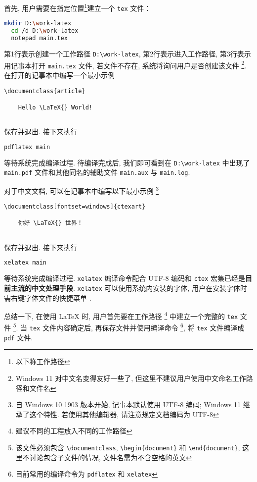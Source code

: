 首先, 用户需要在指定位置\footnote{以下称工作路径}建立一个 \texttt{tex} 文件：
\begin{lstlisting}[language = bash]
  mkdir D:\work-latex
  cd /d D:\work-latex
  notepad main.tex
\end{lstlisting}
第1行表示创建一个工作路径 \texttt{D:\textbackslash work-latex},
第2行表示进入工作路径, 第3行表示用记事本打开 \texttt{main.tex} 文件,
若文件不存在, 系统将询问用户是否创建该文件%
\footnote{Windows 11 对中文名变得友好一些了,
但这里不建议用户使用中文命名工作路径和文件名}.
在打开的记事本中编写一个最小示例
\begin{lstlisting}[language={[LaTeX]TeX}]
  \documentclass{article}
  
    Hello \LaTeX{} World!
  
\end{lstlisting}
保存并退出. 
接下来执行
\begin{lstlisting}[language=bash]
  pdflatex main
\end{lstlisting}
等待系统完成编译过程. 
待编译完成后, 我们即可看到在 \texttt{D:\textbackslash work-latex}
中出现了 \texttt{main.pdf} 文件和其他同名的辅助文件
\texttt{main.aux} 与 \texttt{main.log}. 

对于中文文档, 可以在记事本中编写以下最小示例%
\footnote{自 Windows 10 1903 版本开始, 记事本默认使用 UTF-8 编码;
Windows 11 继承了这个特性.
若使用其他编辑器,
请注意规定文档编码为 UTF-8}%
\begin{lstlisting}[language={[LaTeX]TeX}]
  \documentclass[fontset=windows]{ctexart}
  
    你好 \LaTeX{} 世界！
  
\end{lstlisting}
保存并退出.
接下来执行
\begin{lstlisting}[language=bash]
  xelatex main
\end{lstlisting}
等待系统完成编译过程.
\texttt{xelatex} 编译命令配合 UTF-8 编码和 \texttt{ctex}
宏集已经是\textbf{目前主流的中文处理手段}.
\texttt{xelatex} 可以使用系统内安装的字体,
用户在安装字体时需右键字体文件的快捷菜单 .

总结一下, 在使用 \LaTeX{} 时, 用户首先要在工作路径%
\footnote{建议不同的工程放入不同的工作路径}%
中建立一个完整的 \texttt{tex} 文件%
\footnote{该文件必须包含 \texttt{\textbackslash documentclass},
\texttt{\textbackslash begin\{document\}} 和
\texttt{\textbackslash end\{document\}},
这里不讨论包含子文件的情况,
文件名需为不含空格的英文}.
当 \texttt{tex} 文件内容确定后, 再保存文件并使用编译命令%
\footnote{目前常用的编译命令为 \texttt{pdflatex} 和 \texttt{xelatex}},
将 \texttt{tex} 文件编译成 \texttt{pdf} 文件. 

